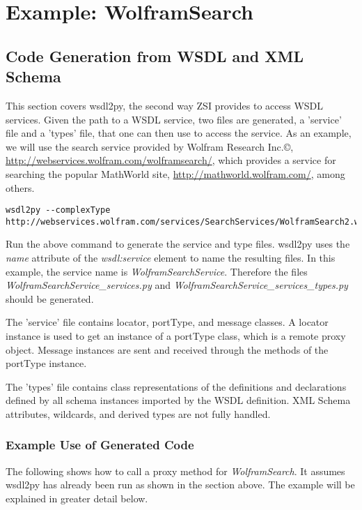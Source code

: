 \chapter{Example: WolframSearch}
\section{Code Generation from WSDL and XML Schema}

This section covers wsdl2py, the second way ZSI provides to access WSDL
services.  Given the path to a WSDL service, two files are generated, a
'service' file and a 'types' file, that one can then use to access the
service.  As an example, we will use the search service provided by Wolfram
Research Inc.\copyright{}, \url{http://webservices.wolfram.com/wolframsearch/},
which provides a service for searching the popular MathWorld site,
\url{http://mathworld.wolfram.com/}, among others.

\begin{verbatim}
wsdl2py --complexType http://webservices.wolfram.com/services/SearchServices/WolframSearch2.wsdl
\end{verbatim}

Run the above command to generate the service and type files.  wsdl2py uses
the {\it name} attribute of the {\it wsdl:service} element to name the resulting files.
In this example, the service name is {\it WolframSearchService}.  Therefore the files
{\it WolframSearchService_services.py} and {\it WolframSearchService_services_types.py}
should be generated.

The 'service' file contains locator, portType, and message classes.
A locator instance is used to get an instance of a portType class,
which is a remote proxy object. Message instances are sent and received
through the methods of the portType instance.

The 'types' file contains class representations of the definitions and
declarations defined by all schema instances imported by the WSDL definition.
XML Schema attributes, wildcards, and derived types are not fully
handled.

\subsection{Example Use of Generated Code}

The following shows how to call a proxy method for {\it WolframSearch}.  It
assumes wsdl2py has already been run as shown in the section above.  The example
will be explained in greater detail below.

